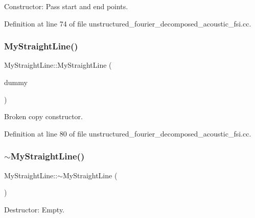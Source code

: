 Constructor\+: Pass start and end points. 



Definition at line 74 of file unstructured\+\_\+fourier\+\_\+decomposed\+\_\+acoustic\+\_\+fsi.\+cc.

\mbox{\label{classMyStraightLine_a4c42312f35a3cf72f2f39e88ad28202f}} 
\subsubsection{\texorpdfstring{My\+Straight\+Line()}{MyStraightLine()}\hspace{0.1cm}{\footnotesize\ttfamily [2/2]}}
{\footnotesize\ttfamily My\+Straight\+Line\+::\+My\+Straight\+Line (\begin{DoxyParamCaption}\item[{const \hyperlink{classMyStraightLine}{My\+Straight\+Line} \&}]{dummy }\end{DoxyParamCaption})\hspace{0.3cm}{\ttfamily [inline]}}



Broken copy constructor. 



Definition at line 80 of file unstructured\+\_\+fourier\+\_\+decomposed\+\_\+acoustic\+\_\+fsi.\+cc.

\mbox{\label{classMyStraightLine_ae2f9a5860652a726b2f4dc94d1332ef1}} 
\subsubsection{\texorpdfstring{$\sim$\+My\+Straight\+Line()}{~MyStraightLine()}}
{\footnotesize\ttfamily My\+Straight\+Line\+::$\sim$\+My\+Straight\+Line (\begin{DoxyParamCaption}{ }\end{DoxyParamCaption})\hspace{0.3cm}{\ttfamily [inline]}}



Destructor\+: Empty. 



